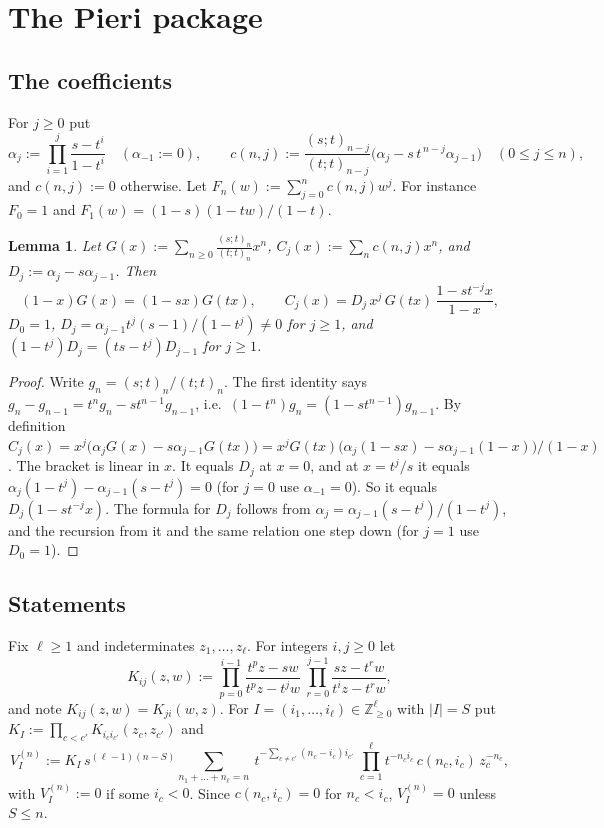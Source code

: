 \documentclass[11pt]{amsart}
\newtheorem{lemma}[theorem]{Lemma}
\theoremstyle{definition}
\theoremstyle{remark}
\numberwithin{equation}{section}
\begin{document}
\section{The Pieri package}\label{sec:pieri}

\subsection{The coefficients}
For $j\ge0$ put
\[ \alpha_j:=\prod_{i=1}^{j}\frac{s-t^i}{1-t^i}\quad(\alpha_{-1}:=0),\qquad c(n,j):=\frac{(s;t)_{n-j}}{(t;t)_{n-j}}\bigl(\alpha_j-s\,t^{\,n-j}\alpha_{j-1}\bigr)\quad(0\le j\le n), \]
and $c(n,j):=0$ otherwise. Let $F_n(w):=\sum_{j=0}^nc(n,j)w^j$. For instance $F_0=1$ and $F_1(w)=(1-s)(1-tw)/(1-t)$.

\begin{lemma}\label{lem:Cj}
Let $G(x):=\sum_{n\ge0}\frac{(s;t)_n}{(t;t)_n}x^n$, $C_j(x):=\sum_nc(n,j)x^n$, and $D_j:=\alpha_j-s\alpha_{j-1}$. Then
\[ (1-x)G(x)=(1-sx)G(tx),\qquad C_j(x)=D_j\,x^j\,G(tx)\,\frac{1-st^{-j}x}{1-x}, \]
$D_0=1$, $D_j=\alpha_{j-1}t^j(s-1)/(1-t^j)\neq0$ for $j\ge1$, and $(1-t^j)D_j=(ts-t^j)D_{j-1}$ for $j\ge1$.
\end{lemma}
\begin{proof}
Write $g_n=(s;t)_n/(t;t)_n$. The first identity says $g_n-g_{n-1}=t^ng_n-st^{n-1}g_{n-1}$, i.e.\ $(1-t^n)g_n=(1-st^{n-1})g_{n-1}$. By definition $C_j(x)=x^j\bigl(\alpha_jG(x)-s\alpha_{j-1}G(tx)\bigr)=x^jG(tx)\bigl(\alpha_j(1-sx)-s\alpha_{j-1}(1-x)\bigr)/(1-x)$. The bracket is linear in $x$. It equals $D_j$ at $x=0$, and at $x=t^j/s$ it equals $\alpha_j(1-t^j)-\alpha_{j-1}(s-t^j)=0$ (for $j=0$ use $\alpha_{-1}=0$). So it equals $D_j(1-st^{-j}x)$. The formula for $D_j$ follows from $\alpha_j=\alpha_{j-1}(s-t^j)/(1-t^j)$, and the recursion from it and the same relation one step down (for $j=1$ use $D_0=1$).
\end{proof}

\subsection{Statements}
Fix $\ell\ge1$ and indeterminates $z_1,\dots,z_\ell$. For integers $i,j\ge0$ let
\[ K_{ij}(z,w):=\prod_{p=0}^{i-1}\frac{t^pz-sw}{t^pz-t^jw}\ \prod_{r=0}^{j-1}\frac{sz-t^rw}{t^iz-t^rw}, \]
and note $K_{ij}(z,w)=K_{ji}(w,z)$. For $I=(i_1,\dots,i_\ell)\in\mathbb{Z}_{\ge0}^\ell$ with $|I|=S$ put $K_I:=\prod_{c<c'}K_{i_ci_{c'}}(z_c,z_{c'})$ and
\[ V^{(n)}_I:=K_I\,s^{(\ell-1)(n-S)}\sum_{n_1+\dots+n_\ell=n}\ t^{-\sum_{c\neq c'}(n_c-i_c)i_{c'}}\ \prod_{c=1}^\ell t^{-n_ci_c}\,c(n_c,i_c)\,z_c^{-n_c}, \]
with $V^{(n)}_I:=0$ if some $i_c<0$. Since $c(n_c,i_c)=0$ for $n_c<i_c$, $V^{(n)}_I=0$ unless $S\le n$.
\end{document}

